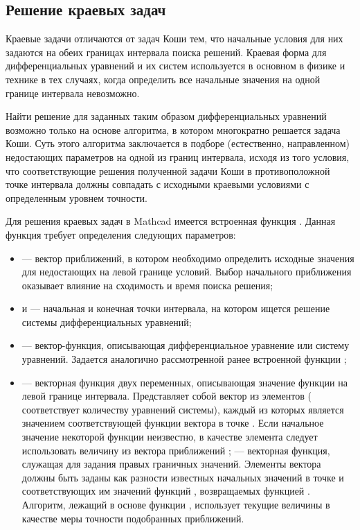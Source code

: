 
\subsection*{Решение краевых задач}

Краевые задачи отличаются от задач Коши тем, что начальные условия для них задаются на обеих границах интервала поиска решений. Краевая форма для дифференциальных уравнений и их систем используется в основном в физике и технике в тех случаях, когда определить все начальные значения на одной границе интервала невозможно. 

Найти решение для заданных таким образом дифференциальных уравнений возможно только на основе алгоритма, в котором многократно решается задача Коши. Суть этого алгоритма заключается в подборе (естественно, направленном) недостающих параметров на одной из границ интервала, исходя из того условия, что соответствующие решения полученной задачи Коши в противоположной точке интервала должны совпадать с исходными краевыми условиями с определенным уровнем точности.

Для решения краевых задач в Mathcad имеется встроенная функция . Данная функция требует определения следующих параметров:
\begin{itemize}[label={}]
	\item {} --- вектор приближений, в котором необходимо определить исходные значения для недостающих на левой границе условий. Выбор начального приближения оказывает влияние на сходимость и время поиска решения;
	\item {} и  --- начальная и конечная точки интервала, на котором ищется решение системы дифференциальных уравнений;
	\item {} --- вектор-функция, описывающая дифференциальное уравнение или систему уравнений. Задается аналогично рассмотренной ранее встроенной функции ;
	\item {} --- векторная функция двух переменных, описывающая значение функции на левой границе интервала. Представляет собой вектор из  элементов ( соответствует количеству уравнений системы), каждый из которых является значением соответствующей функции вектора  в точке . Если начальное значение некоторой функции неизвестно, в качестве элемента  следует использовать величину из вектора приближений ;
	 --- векторная функция, служащая для задания правых граничных значений. Элементы вектора  должны быть заданы как разности известных начальных значений в точке  и соответствующих им значений функций , возвращаемых функцией . Алгоритм, лежащий в основе функции , использует текущие величины  в качестве меры точности подобранных приближений. 
\end{itemize}

